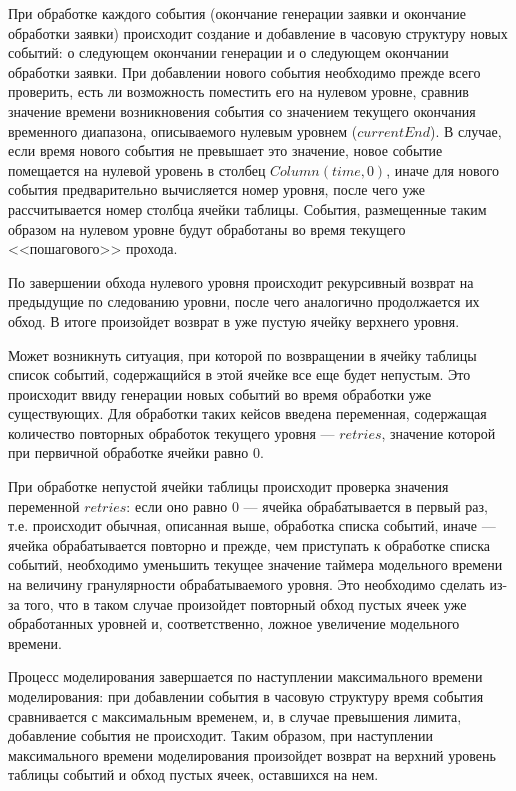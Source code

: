 При обработке каждого события (окончание генерации заявки и окончание обработки заявки) происходит создание и добавление в часовую структуру новых событий: о следующем окончании генерации и о следующем окончании обработки заявки. При добавлении нового события необходимо прежде всего проверить, есть ли возможность поместить его на нулевом уровне, сравнив значение времени возникновения события со значением текущего окончания временного диапазона, описываемого нулевым уровнем ($currentEnd$). В случае, если время нового события не превышает это значение, новое событие помещается на нулевой уровень в столбец $Column(time, 0)$, иначе для нового события предварительно вычисляется номер уровня, после чего уже рассчитывается номер столбца ячейки таблицы. События, размещенные таким образом на нулевом уровне будут обработаны во время текущего <<пошагового>> прохода.

По завершении обхода нулевого уровня происходит рекурсивный возврат на предыдущие по следованию уровни, после чего аналогично продолжается их обход. В итоге произойдет возврат в уже пустую ячейку верхнего уровня.

Может возникнуть ситуация, при которой по возвращении в ячейку таблицы список событий, содержащийся в этой ячейке все еще будет непустым. Это происходит ввиду генерации новых событий во время обработки уже существующих. Для обработки таких кейсов введена переменная, содержащая количество повторных обработок текущего уровня --- $retries$, значение которой при первичной обработке ячейки равно 0. 

При обработке непустой ячейки таблицы происходит проверка значения переменной $retries$: если оно равно 0 --- ячейка обрабатывается в первый раз, т.е. происходит обычная, описанная выше, обработка списка событий, иначе --- ячейка обрабатывается повторно и прежде, чем приступать к обработке списка событий, необходимо уменьшить текущее значение таймера модельного времени на величину гранулярности обрабатываемого уровня. Это необходимо сделать из-за того, что в таком случае произойдет повторный обход пустых ячеек уже обработанных уровней и, соответственно, ложное увеличение модельного времени.

Процесс моделирования завершается по наступлении максимального времени моделирования: при добавлении события в часовую структуру время события сравнивается с максимальным временем, и, в случае превышения лимита, добавление события не происходит. Таким образом, при наступлении максимального времени моделирования произойдет возврат на верхний уровень таблицы событий и обход пустых ячеек, оставшихся на нем.


